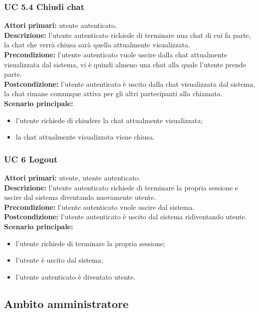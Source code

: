 \subsubsection{UC 5.4 Chiudi chat}
\noindent
\textbf{Attori primari:} utente autenticato.\\
\textbf{Descrizione:} l'utente autenticato richiede di terminare una chat di cui fa parte, la chat che verrà chiusa sarà quella attualmente visualizzata.\\
\textbf{Precondizione:} l'utente autenticato vuole uscire dalla chat attualmente visualizzata dal sistema, vi è quindi almeno una chat alla quale l'utente prende parte.\\
\textbf{Postcondizione:} l'utente autenticato è uscito dalla chat visualizzata dal sistema, la chat rimane comunque attiva per gli altri partecipanti alla chiamata.\\
\textbf{Scenario principale:}
\begin{itemize}
\item l'utente richiede di chiudere la chat attualmente visualizzata;
\item la chat attualmente visualizzata viene chiusa.
\end{itemize}

\subsubsection{UC 6 Logout}
\noindent
\textbf{Attori primari:} utente, utente autenticato.\\
\textbf{Descrizione:} l'utente autenticato richiede di terminare la propria sessione e uscire dal sistema diventando nuovamente utente.\\
\textbf{Precondizione:} l'utente autenticato vuole uscire dal sistema.\\
\textbf{Postcondizione:} l'utente autenticato è uscito dal sistema ridiventando utente.\\
\textbf{Scenario principale:}
\begin{itemize}
\item l'utente richiede di terminare la propria sessione;
\item l'utente è uscito dal sistema;
\item l'utente autenticato è diventato utente.
\end{itemize}

\newpage

\subsection{Ambito amministratore}
